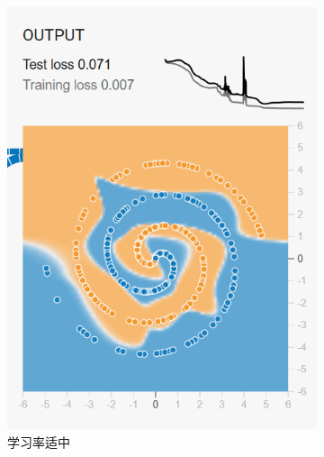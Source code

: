 \documentclass[printMode=true, declarePage=false]{ecnuthesis}
\begin{document}
\begin{figure}[htbp]
\begin{subfigure}[b]{0.3\textwidth}
            \includegraphics[width=\textwidth]{medium-003.png}
            \caption{学习率适中}
            \label{fig:step086}
        \end{subfigure}
        \hfill
        \begin{subfigure}[b]{0.3\textwidth}
            \centering

\end{subfigure}
\end{figure}
\end{document}
